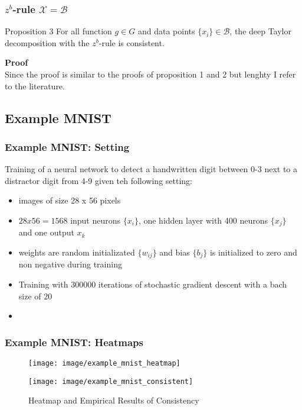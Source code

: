 \documentclass{beamer}
\begin{document}
\begin{frame}
\frametitle{$z^b$-rule $\mathcal{X}=\mathcal{B}$}
\vspace{-0.4cm}
\begin{block}{Proposition 3}
For all function $g \in G$ and data points $\{x_i\} \in \mathcal{B}$, the deep Taylor decomposition with the $z^b$-rule is consistent.
\end{block}
\vspace{0.5cm}
\textbf{Proof}\\
Since the proof is similar to the proofs of proposition 1 and 2 but lenghty I refer to the literature.

\end{frame}



\subsection[Example MINST]{Example MNIST}



\begin{frame}
\frametitle{Example MNIST: Setting}
Training of a neural network to detect a handwritten digit between 0-3 next to a distractor digit from 4-9 given teh following setting:
\begin{itemize}
\item images of size 28 x 56 pixels
\item $28 x 56 = 1568$ input neurons $\{x_i\}$, one hidden layer with 400 neurons $\{x_j\}$ and one output $x_k$
\item weights are random initializated $\{w_{ij}\}$ and bias $\{b_j\}$ is initialized to zero and non negative during training
\item Training with 300000 iterations of stochastic gradient descent with a bach size of 20
\item 
\end{itemize}

\end{frame}


\begin{frame}
\frametitle{Example MNIST: Heatmaps}
\vspace{0.5cm}
\begin{figure}
\texttt{[image: image/example\_mnist\_heatmap]}
\end{figure}

\begin{figure}
\texttt{[image: image/example\_mnist\_consistent]}
\vspace{-0.75cm}
\caption{Heatmap and Empirical Results of Consistency}
\end{figure}


\end{frame}
\end{document}
